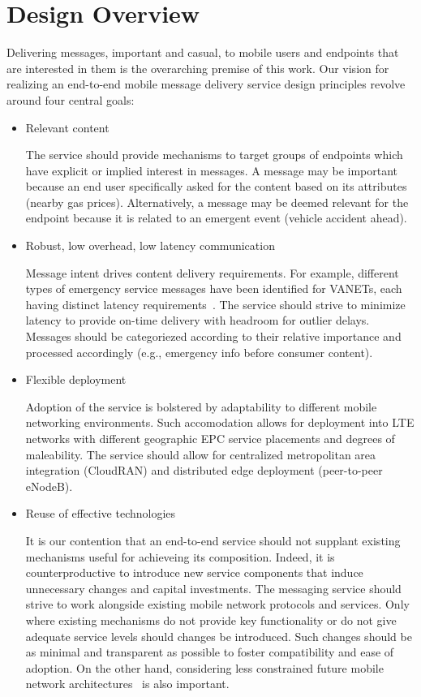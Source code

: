 \section{Design Overview}
\label{sec:design}

Delivering messages, important and casual, to mobile users and
endpoints that are interested in them is the overarching premise of
this work. Our vision for realizing an end-to-end mobile message
delivery service design principles revolve around four central
goals:

\begin{itemize}
\item Relevant content

The service should provide mechanisms to target groups of endpoints
which have explicit or implied interest in messages. A message may be
important because an end user specifically asked for the content based
on its attributes (nearby gas prices). Alternatively, a message may be
deemed relevant for the endpoint because it is related to an emergent
event (vehicle accident ahead).

\item Robust, low overhead, low latency communication

Message intent drives content delivery requirements.  For example,
different types of emergency service messages have been identified for
VANETs, each having distinct latency
requirements~\cite{camp2005vehicle}. The service should strive to
minimize latency to provide on-time delivery with headroom for outlier
delays. Messages should be categoriezed according to their relative
importance and processed accordingly (e.g., emergency info before
consumer content).

\item Flexible deployment

Adoption of the service is bolstered by adaptability to different
mobile networking environments.  Such accomodation allows for
deployment into LTE networks with different geographic EPC service
placements and degrees of maleability.  The service should allow for
centralized metropolitan area integration (CloudRAN) and distributed
edge deployment (peer-to-peer eNodeB).

\item Reuse of effective technologies

It is our contention that an end-to-end service should not supplant
existing mechanisms useful for achieveing its composition.  Indeed, it
is counterproductive to introduce new service components that induce
unnecessary changes and capital investments. The messaging service
should strive to work alongside existing mobile network protocols and
services.  Only where existing mechanisms do not provide key
functionality or do not give adequate service levels should changes be
introduced.  Such changes should be as minimal and transparent as
possible to foster compatibility and ease of adoption. On the other
hand, considering less constrained future mobile network
architectures~\cite{5gvision,venkataramani2014mobility} is also
important.

\end{itemize}


